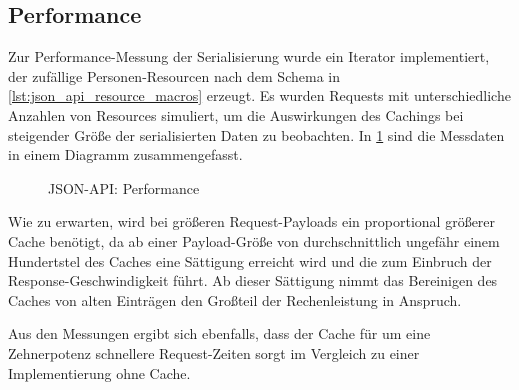 \subsection{Performance}
\label{ssec:bj_performance}

Zur Performance-Messung der Serialisierung wurde ein Iterator implementiert,
der zufällige Personen-Resourcen nach dem Schema in
\cref{lst:json_api_resource_macros} erzeugt.  Es wurden Requests mit
unterschiedliche Anzahlen von Resources simuliert, um die Auswirkungen des
Cachings bei steigender Größe der serialisierten Daten zu beobachten.  In
\cref{fig:json_api_performance} sind die Messdaten in einem Diagramm
zusammengefasst.

\begin{figure}
	\center
	
	\caption{JSON-API: Performance}
	\label{fig:json_api_performance}
\end{figure}

Wie zu erwarten, wird bei größeren Request-Payloads ein proportional größerer
Cache benötigt, da ab einer Payload-Größe von durchschnittlich ungefähr einem
Hundertstel des Caches eine Sättigung erreicht wird und die zum Einbruch der
Response-Geschwindigkeit führt.  Ab dieser Sättigung nimmt das Bereinigen des
Caches von alten Einträgen den Großteil der Rechenleistung in Anspruch.

Aus den Messungen ergibt sich ebenfalls, dass der Cache für um eine
Zehnerpotenz schnellere Request-Zeiten sorgt im Vergleich zu einer
Implementierung ohne Cache.
